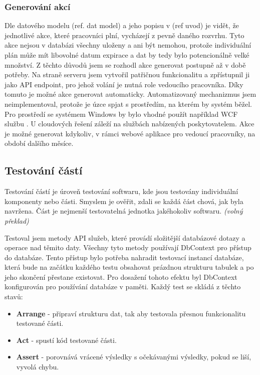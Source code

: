 \documentclass[
  biblatex,
  glossaries,
  index
]{kidiplom}
\begin{document}
\subsubsection{Generování akcí}
\label{sec:actionGenerating}
Dle datového modelu (ref. dat model) a jeho popisu v (ref uvod) je vidět, že jednotlivé akce, které pracovníci plní, vycházejí z pevně daného rozvrhu. Tyto akce nejsou v databázi všechny uloženy a ani být nemohou, protože individuální plán může mít libovolné datum expirace a dat by tedy bylo potencionálně velké množství. Z těchto důvodů jsem se rozhodl akce generovat postupně až v době potřeby. Na straně serveru jsem vytvořil patřičnou funkcionalitu a zpřístupnil ji jako API endpoint, pro jehož volání je nutná role vedoucího pracovníka. Díky tomuto je možné akce generovat automaticky. Automatizovaný mechanizmus jsem neimplementoval, protože je úzce spjat s prostředím, na kterém by systém běžel. Pro prostředí se systémem Windows by bylo vhodné použít například WCF službu \cite{11}. U cloudových řešení záleží na službách nabízených poskytovatelem. Akce je možné generovat kdykoliv, v rámci webové aplikace pro vedoucí pracovníky, na období dalšího měsíce.

\subsection{Testování částí}
Testování částí je úroveň testování softwaru, kde jsou testovány individuální komponenty nebo části. Smyslem je ověřit, zdali se každá část chová, jak byla navržena. Část je nejmenší testovatelná jednotka jakéhokoliv softwaru.\cite{12} \textit{(volný překlad)}

Testoval jsem metody API služeb, které provádí složitější databázové dotazy a operace nad těmito daty. Všechny tyto metody používají DbContext pro přístup do databáze. Tento přístup bylo potřeba nahradit testovací instancí databáze, která bude na začátku každého testu obsahovat prázdnou strukturu tabulek a po jeho skončení přestane existovat. Pro dosažení tohoto efektu byl DbContext konfigurován pro používání databáze v paměti. Každý test se skládá z těchto stavů: 
\begin{itemize}
	\item \textbf{Arrange} - připraví strukturu dat, tak aby testovala přesnou funkcionalitu testované části.
	\item \textbf{Act} - spustí kód testované části.
	\item \textbf{Assert} - porovnává vrácené výsledky s očekávanými výsledky, pokud se liší, vyvolá chybu.
\end{itemize}
\end{document}
